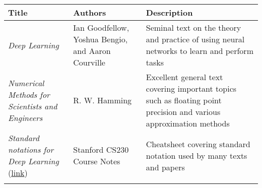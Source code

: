 \documentclass[
]{article}
\begin{document}
\begin{longtable}[]{@{}lll@{}}
\toprule
\begin{minipage}[b]{0.30\columnwidth}\raggedright
Title\strut
\end{minipage} & \begin{minipage}[b]{0.30\columnwidth}\raggedright
Authors\strut
\end{minipage} & \begin{minipage}[b]{0.30\columnwidth}\raggedright
Description\strut
\end{minipage}\tabularnewline
\midrule
\endhead
\begin{minipage}[t]{0.30\columnwidth}\raggedright
\emph{Deep Learning}\strut
\end{minipage} & \begin{minipage}[t]{0.30\columnwidth}\raggedright
Ian Goodfellow, Yoshua Bengio, and Aaron Courville\strut
\end{minipage} & \begin{minipage}[t]{0.30\columnwidth}\raggedright
Seminal text on the theory and practice of using neural networks to
learn and perform tasks\strut
\end{minipage}\tabularnewline
\begin{minipage}[t]{0.30\columnwidth}\raggedright
\emph{Numerical Methods for Scientists and Engineers}\strut
\end{minipage} & \begin{minipage}[t]{0.30\columnwidth}\raggedright
R. W. Hamming\strut
\end{minipage} & \begin{minipage}[t]{0.30\columnwidth}\raggedright
Excellent general text covering important topics such as floating point
precision and various approximation methods\strut
\end{minipage}\tabularnewline
\begin{minipage}[t]{0.30\columnwidth}\raggedright
\emph{Standard notations for Deep Learning}
(\href{https://cs230.stanford.edu/files/Notation.pdf}{link})\strut
\end{minipage} & \begin{minipage}[t]{0.30\columnwidth}\raggedright
Stanford CS230 Course Notes\strut
\end{minipage} & \begin{minipage}[t]{0.30\columnwidth}\raggedright
Cheatsheet covering standard notation used by many texts and
papers\strut
\end{minipage}\tabularnewline
\begin{minipage}[t]{0.30\columnwidth}\raggedright

\end{minipage}
\end{longtable}
\end{document}
